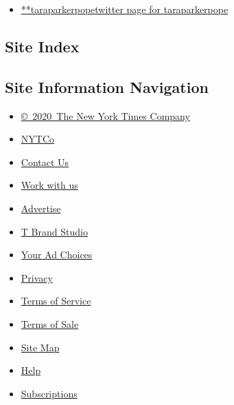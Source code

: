 \begin{itemize}
\tightlist
\item
  \href{https://twitter.com/taraparkerpope}{**taraparkerpopetwitter page
  for taraparkerpope}
\end{itemize}

\hypertarget{site-index}{%
\subsection{Site Index}\label{site-index}}

\hypertarget{site-information-navigation}{%
\subsection{Site Information
Navigation}\label{site-information-navigation}}

\begin{itemize}
\tightlist
\item
  \href{https://help.nytimes3xbfgragh.onion/hc/en-us/articles/115014792127-Copyright-notice}{©~2020~The
  New York Times Company}
\end{itemize}

\begin{itemize}
\tightlist
\item
  \href{https://www.nytco.com/}{NYTCo}
\item
  \href{https://help.nytimes3xbfgragh.onion/hc/en-us/articles/115015385887-Contact-Us}{Contact
  Us}
\item
  \href{https://www.nytco.com/careers/}{Work with us}
\item
  \href{https://nytmediakit.com/}{Advertise}
\item
  \href{http://www.tbrandstudio.com/}{T Brand Studio}
\item
  \href{https://www.nytimes3xbfgragh.onion/privacy/cookie-policy\#how-do-i-manage-trackers}{Your
  Ad Choices}
\item
  \href{https://www.nytimes3xbfgragh.onion/privacy}{Privacy}
\item
  \href{https://help.nytimes3xbfgragh.onion/hc/en-us/articles/115014893428-Terms-of-service}{Terms
  of Service}
\item
  \href{https://help.nytimes3xbfgragh.onion/hc/en-us/articles/115014893968-Terms-of-sale}{Terms
  of Sale}
\item
  \href{https://spiderbites.nytimes3xbfgragh.onion}{Site Map}
\item
  \href{https://help.nytimes3xbfgragh.onion/hc/en-us}{Help}
\item
  \href{https://www.nytimes3xbfgragh.onion/subscription?campaignId=37WXW}{Subscriptions}
\end{itemize}

